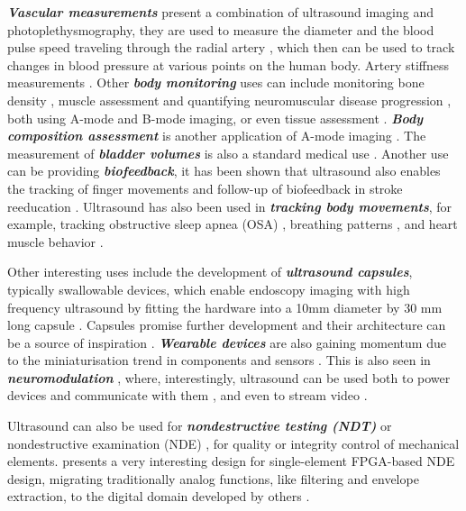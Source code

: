 \documentclass{article}
\begin{document}
\textbf{\textit{Vascular measurements}} present a combination of ultrasound imaging and photoplethysmography, they are used to measure the diameter and the blood pulse speed traveling through the radial artery \cite{worthing_using_2016}, which then can be used to track changes in blood pressure at various points on the human body. Artery stiffness measurements \cite{joseph_technical_2015, joseph_artsenstouch_2015, seo_non-invasive_2018}. Other \textbf{\textit{body monitoring}} uses can include monitoring bone density \cite{wahab_design_2016, fontes-pereira_monitoring_2018}, muscle assessment \cite{brausch_towards_2019} and quantifying neuromuscular disease progression \cite{zhang_design_2015}, both using A-mode and B-mode imaging, or even tissue assessment \cite{keyes_electrical_2017}. \textbf{\textit{Body composition assessment}} is another application of A-mode imaging \cite{wagner_validity_2016, martins_-scan_2017}. The measurement of \textbf{\textit{bladder volumes}} is also a standard medical use \cite{kuru_feasibility_2019}. Another use can be providing \textbf{\textit{biofeedback}}, it has been shown that ultrasound also enables the tracking of finger movements \cite{sikdar_novel_2014} and follow-up of biofeedback in stroke reeducation \cite{sosnowska_training_2019}. Ultrasound has also been used in \textbf{\textit{tracking body movements}}, for example, tracking obstructive sleep apnea (OSA) \cite{weng_fpga-based_2015}, breathing patterns \cite{shahshahani_ultrasound_2018}, and heart muscle behavior \cite{nguyen_estimating_2019}.

Other interesting uses include the development of \textbf{\textit{ultrasound capsules}}, typically swallowable devices, which enable endoscopy imaging with high frequency ultrasound by fitting the hardware into a 10mm diameter by 30 mm long capsule \cite{cox_ultrasound_2017, wang_development_2017}. Capsules promise further development and their architecture can be a source of inspiration \cite{lee_towards_2014, memon_capsule_2016, lay_progress_2016, lay_-vivo_2018}. \textbf{\textit{ Wearable devices}} are also gaining momentum due to the miniaturisation trend in components and sensors \cite{basak_wearable_2013}. This is also seen in \textbf{\textit{neuromodulation}} \cite{pashaei_flexible_2020}, where, interestingly, ultrasound can be used both to power devices and communicate with them \cite{johnson_stimdust_2018, seo_wireless_2016, santagati_design_2020}, and even to stream video \cite{kou_real-time_2020}.

Ultrasound can also be used for \textbf{\textit{nondestructive testing (NDT)}} or nondestructive examination (NDE)  \cite{duncan_real-time_1990,noauthor_integration_nodate}, for quality or integrity control of mechanical elements. \cite{fritsch_full_nodate} presents a very interesting design for single-element FPGA-based NDE design, migrating traditionally analog functions, like filtering and envelope extraction, to the digital domain developed by others  \cite{triger_modular_2008, shrisha_fpga_2018, rodriguez-olivares_improvement_2018}. 
\end{document}
